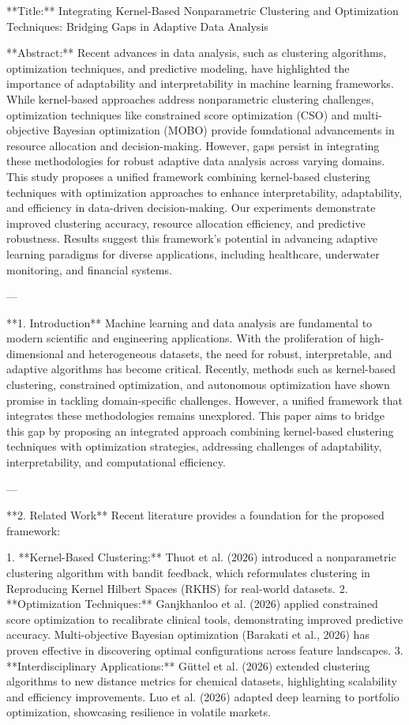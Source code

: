 **Title:** Integrating Kernel-Based Nonparametric Clustering and Optimization Techniques: Bridging Gaps in Adaptive Data Analysis  

**Abstract:**  
Recent advances in data analysis, such as clustering algorithms, optimization techniques, and predictive modeling, have highlighted the importance of adaptability and interpretability in machine learning frameworks. While kernel-based approaches address nonparametric clustering challenges, optimization techniques like constrained score optimization (CSO) and multi-objective Bayesian optimization (MOBO) provide foundational advancements in resource allocation and decision-making. However, gaps persist in integrating these methodologies for robust adaptive data analysis across varying domains. This study proposes a unified framework combining kernel-based clustering techniques with optimization approaches to enhance interpretability, adaptability, and efficiency in data-driven decision-making. Our experiments demonstrate improved clustering accuracy, resource allocation efficiency, and predictive robustness. Results suggest this framework's potential in advancing adaptive learning paradigms for diverse applications, including healthcare, underwater monitoring, and financial systems.  

---

**1. Introduction**  
Machine learning and data analysis are fundamental to modern scientific and engineering applications. With the proliferation of high-dimensional and heterogeneous datasets, the need for robust, interpretable, and adaptive algorithms has become critical. Recently, methods such as kernel-based clustering, constrained optimization, and autonomous optimization have shown promise in tackling domain-specific challenges. However, a unified framework that integrates these methodologies remains unexplored. This paper aims to bridge this gap by proposing an integrated approach combining kernel-based clustering techniques with optimization strategies, addressing challenges of adaptability, interpretability, and computational efficiency.  

---

**2. Related Work**  
Recent literature provides a foundation for the proposed framework:  

1. **Kernel-Based Clustering:** Thuot et al. (2026) introduced a nonparametric clustering algorithm with bandit feedback, which reformulates clustering in Reproducing Kernel Hilbert Spaces (RKHS) for real-world datasets.  
2. **Optimization Techniques:** Ganjkhanloo et al. (2026) applied constrained score optimization to recalibrate clinical tools, demonstrating improved predictive accuracy. Multi-objective Bayesian optimization (Barakati et al., 2026) has proven effective in discovering optimal configurations across feature landscapes.  
3. **Interdisciplinary Applications:** Güttel et al. (2026) extended clustering algorithms to new distance metrics for chemical datasets, highlighting scalability and efficiency improvements. Luo et al. (2026) adapted deep learning to portfolio optimization, showcasing resilience in volatile markets.  


